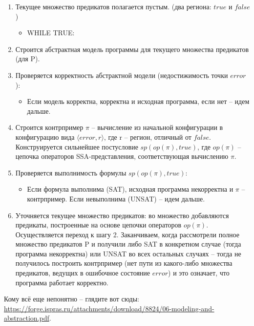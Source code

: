 \begin{enumerate}
	\item Текущее множество предикатов полагается пустым. (два региона: $true$ и $false$)
			\begin{itemize}
				\item WHILE TRUE:
			\end{itemize}
	\item Строится абстрактная модель программы для текущего множества предикатов (для P).
	\item Проверяется корректность абстрактной модели (недостижимость точки $\textit{error}$):
		\begin{itemize}
			\item Если модель корректна, корректна и исходная программа, если нет -- идем дальше.
		\end{itemize}
	\item Строится контрпример $\pi$ -- вычисление из начальной конфигурации в конфигурацию вида $\langle \textit{error}, r \rangle$, где r -- регион, отличный от $\textit{false}$. \newline Конструируется сильнейшее постусловие $sp(op(\pi), \textit{true})$, где $\textit{op}(\pi)$ -- цепочка операторов SSA-представления, соответствующая вычислению $\pi$.
	\item Проверяется выполнимость формулы $sp(op(\pi), \textit{true})$:
		\begin{itemize}
			\item Если формула выполнима (SAT), исходная программа некорректна и $\pi$ -- контрпример. Если невыполнима (UNSAT) -- идем дальше.
		\end{itemize}
	\item Уточняется текущее множество предикатов: во множество добавляются предикаты, построенные на основе цепочки операторов $\textit{op}(\pi)$. \newline Осуществляется переход к шагу 2. \newline Заканчиваем, когда рассмотрели полное множество предикатов P и получили либо SAT в конкретном случае (тогда программа некорректна) или UNSAT во всех остальных случаях -- тогда не получилось построить контрпример (нет пути из какого-либо множества предикатов, ведущих в ошибочное состояние $error$) и это означает, что программа работает корректно.
\end{enumerate}

Кому всё еще непонятно -- глядите вот сюды: \url{https://forge.ispras.ru/attachments/download/8824/06-modeling-and-abstraction.pdf}.